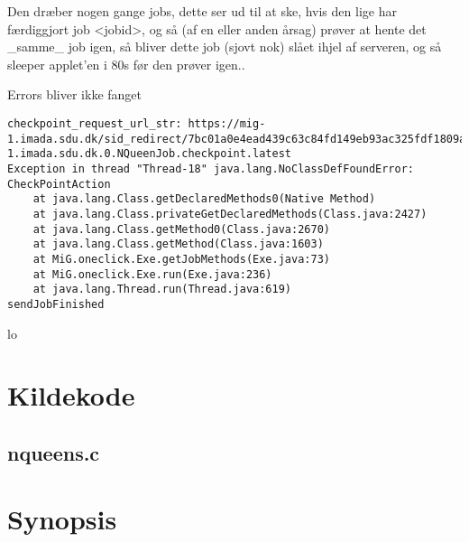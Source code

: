 \documentclass[pdf,draft,a4paper,10pt]{article}
\begin{document}
Den dræber nogen gange jobs, dette ser ud til at ske, hvis den lige har
færdiggjort job <jobid>, og så (af en eller anden årsag) prøver at hente det
\_samme\_ job igen, så bliver dette job (sjovt nok) slået ihjel af serveren, og
så sleeper applet'en i 80s før den prøver igen.. 

Errors bliver ikke fanget
\begin{verbatim}
checkpoint_request_url_str: https://mig-1.imada.sdu.dk/sid_redirect/7bc01a0e4ead439c63c84fd149eb93ac325fdf1809aedc23049c010890bf14bd/13768_6_2_2007__8_42_57_mig-1.imada.sdu.dk.0.NQueenJob.checkpoint.latest
Exception in thread "Thread-18" java.lang.NoClassDefFoundError: CheckPointAction
	at java.lang.Class.getDeclaredMethods0(Native Method)
	at java.lang.Class.privateGetDeclaredMethods(Class.java:2427)
	at java.lang.Class.getMethod0(Class.java:2670)
	at java.lang.Class.getMethod(Class.java:1603)
	at MiG.oneclick.Exe.getJobMethods(Exe.java:73)
	at MiG.oneclick.Exe.run(Exe.java:236)
	at java.lang.Thread.run(Thread.java:619)
sendJobFinished
\end{verbatim}

%

lo


\appendix


\section{Kildekode}
\subsection{nqueens.c}\label{ckode}
%

\section{Synopsis}
%


%
%
\end{document}
